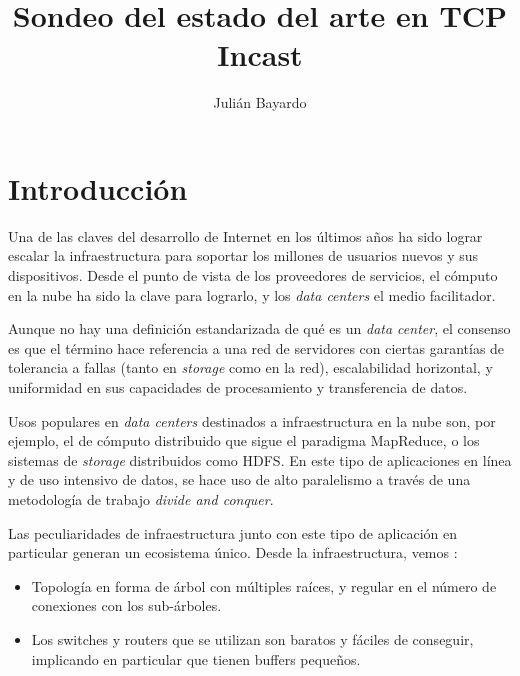 \documentclass[runningheads,a4paper]{llncs}
\begin{document}
\mainmatter

\title{Sondeo del estado del arte en TCP Incast}
\author{Julián Bayardo}

\maketitle

\tableofcontents

\newpage

\section{Introducción}

Una de las claves del desarrollo de Internet en los últimos años ha sido lograr escalar la infraestructura para soportar los millones de usuarios nuevos y sus dispositivos. Desde el punto de vista de los proveedores de servicios, el cómputo en la nube ha sido la clave para lograrlo, y los \textit{data centers} el medio facilitador.

Aunque no hay una definición estandarizada de qué es un \textit{data center}, el consenso es que el término hace referencia a una red de servidores con ciertas garantías de tolerancia a fallas (tanto en \textit{storage} como en la red), escalabilidad horizontal, y uniformidad en sus capacidades de procesamiento y transferencia de datos.

Usos populares en \textit{data centers} destinados a infraestructura en la nube son, por ejemplo, el de cómputo distribuido que sigue el paradigma MapReduce\cite{Dean_MapReduce_2004}, o los sistemas de \textit{storage} distribuidos como HDFS\cite{Shvachko_HDFS_2010}. En este tipo de aplicaciones en línea y de uso intensivo de datos, se hace uso de alto paralelismo a través de una metodología de trabajo \textit{divide and conquer}.

Las peculiaridades de infraestructura junto con este tipo de aplicación en particular generan un ecosistema único. Desde la infraestructura, vemos \cite{Benson_Network_2010}:

\begin{itemize}
\item Topología en forma de árbol con múltiples raíces, y regular en el número de conexiones con los sub-árboles.

\item Los switches y routers que se utilizan son baratos y fáciles de conseguir, implicando en particular que tienen buffers pequeños.
\end{itemize}
\end{document}
